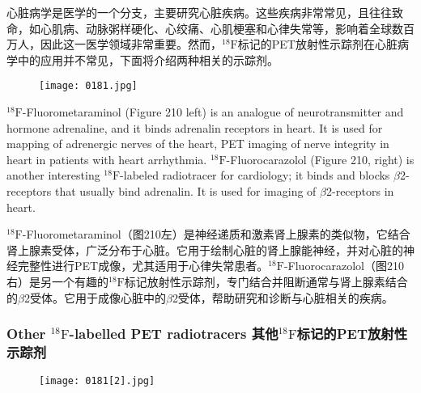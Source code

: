 \documentclass[dvipsnames, svgnames,a4paper,11pt]{article}
\begin{document}
心脏病学是医学的一个分支，主要研究心脏疾病。这些疾病非常常见，且往往致命，如心肌病、动脉粥样硬化、心绞痛、心肌梗塞和心律失常等，影响着全球数百万人，因此这一医学领域非常重要。然而，${}^\mathrm{18}\mathrm{F}$标记的PET放射性示踪剂在心脏病学中的应用并不常见，下面将介绍两种相关的示踪剂。

\begin{figure}[h]
	\centering
    \texttt{[image: 0181.jpg]}  
     \label{fig210}
\end{figure}

${}^\mathrm{18}\mathrm{F}$-Fluorometaraminol (Figure 210 left) is an analogue of neurotransmitter and
hormone adrenaline, and it binds adrenalin receptors in heart. It is used for mapping
of adrenergic nerves of the heart, PET imaging of nerve integrity in heart in patients
with heart arrhythmia. ${}^\mathrm{18}\mathrm{F}$-Fluorocarazolol (Figure 210, right) is another interesting
${}^\mathrm{18}\mathrm{F}$-labeled radiotracer for cardiology; it binds and blocks $\beta$2-receptors that usually
bind adrenalin. It is used for imaging of $\beta$2-receptors in heart.

${}^\mathrm{18}\mathrm{F}$-Fluorometaraminol（图210左）是神经递质和激素肾上腺素的类似物，它结合肾上腺素受体，广泛分布于心脏。它用于绘制心脏的肾上腺能神经，并对心脏的神经完整性进行PET成像，尤其适用于心律失常患者。${}^\mathrm{18}\mathrm{F}$-Fluorocarazolol（图210右）是另一个有趣的${}^\mathrm{18}\mathrm{F}$标记放射性示踪剂，专门结合并阻断通常与肾上腺素结合的$\beta$2受体。它用于成像心脏中的$\beta$2受体，帮助研究和诊断与心脏相关的疾病。

\subsubsection{Other ${}^\mathrm{18}\mathrm{F}$-labelled PET radiotracers 其他${}^\mathrm{18}\mathrm{F}$标记的PET放射性示踪剂}

\begin{figure}[h]
	\centering
    \texttt{[image: 0181[2].jpg]}  
     \label{fig211}
\end{figure}
\end{document}
